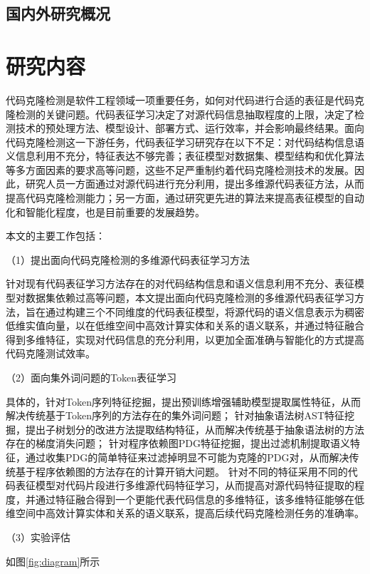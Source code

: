 \subsection{国内外研究概况}

\section{研究内容}

代码克隆检测是软件工程领域一项重要任务，如何对代码进行合适的表征是代码克隆检测的关键问题。代码表征学习决定了对源代码信息抽取程度的上限，决定了检测技术的预处理方法、模型设计、部署方式、运行效率，并会影响最终结果。面向代码克隆检测这一下游任务，代码表征学习研究存在以下不足：对代码结构信息语义信息利用不充分，特征表达不够完善；表征模型对数据集、模型结构和优化算法等多方面因素的要求高等问题，这些不足严重制约着代码克隆检测技术的发展。因此，研究人员一方面通过对源代码进行充分利用，提出多维源代码表征方法，从而提高代码克隆检测能力；另一方面，通过研究更先进的算法来提高表征模型的自动化和智能化程度，也是目前重要的发展趋势。\cite{zhangNovelNeuralSource2019}

本文的主要工作包括：

（1）提出面向代码克隆检测的多维源代码表征学习方法 

针对现有代码表征学习方法存在的对代码结构信息和语义信息利用不充分、表征模型对数据集依赖过高等问题，本文提出面向代码克隆检测的多维源代码表征学习方法，旨在通过构建三个不同维度的代码表征模型，将源代码的语义信息表示为稠密低维实值向量，以在低维空间中高效计算实体和关系的语义联系，并通过特征融合得到多维特征，实现对代码信息的充分利用，以更加全面准确与智能化的方式提高代码克隆测试效率。

（2）面向集外词问题的Token表征学习

具体的，针对Token序列特征挖掘，提出预训练增强辅助模型提取属性特征，从而解决传统基于Token序列的方法存在的集外词问题；
针对抽象语法树AST特征挖掘，提出子树划分的改进方法提取结构特征，从而解决传统基于抽象语法树的方法存在的梯度消失问题；
针对程序依赖图PDG特征挖掘，提出过滤机制提取语义特征，通过收集PDG的简单特征来过滤掉明显不可能为克隆的PDG对，从而解决传统基于程序依赖图的方法存在的计算开销大问题。
针对不同的特征采用不同的代码表征模型对代码片段进行多维源代码特征学习，从而提高对源代码特征提取的程度，并通过特征融合得到一个更能代表代码信息的多维特征，该多维特征能够在低维空间中高效计算实体和关系的语义联系，提高后续代码克隆检测任务的准确率。

（3）实验评估

如图\ref{fig:diagram}所示

